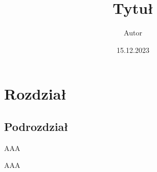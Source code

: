\documentclass[9pt]{beamer}
\title{Tytuł}
\author{Autor}
\institute{Uniwersytet Jagielloński}
\date{15.12.2023}
\begin{document}
%
\begin{frame}
\titlepage
\end{frame}
%
\section{Rozdział}
\subsection{Podrozdział}
\begin{frame}
AAA
\end{frame}
%
\begin{frame}
AAA
\end{frame}
%
\end{document}
